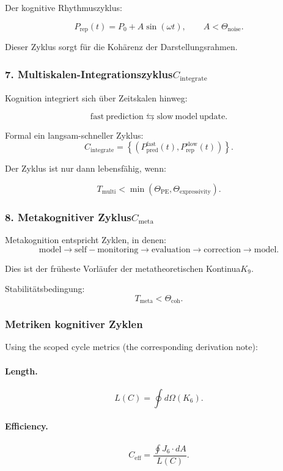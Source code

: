 Der kognitive Rhythmuszyklus:

\[
 P_{\mathrm{rep}}(t) = P_0 + A\sin(\omega t),\qquad
 A < \Theta_{\mathrm{noise}}.
\]

Dieser Zyklus sorgt für die Kohärenz der Darstellungsrahmen.

\subsubsection{7. Multiskalen-Integrationszyklus$C_{\mathrm{integrate}}$}

Kognition integriert sich über Zeitskalen hinweg:

\[
 \mathrm{fast\ prediction}
 \leftrightarrows
 \mathrm{slow\ model\ update}.
\]

Formal ein langsam-schneller Zyklus:
\[
 C_{\mathrm{integrate}} =
 \left\{
   (P_{\mathrm{pred}}^{\mathrm{fast}}(t),
    P_{\mathrm{rep}}^{\mathrm{slow}}(t))
 \right\}.
\]

Der Zyklus ist nur dann lebensfähig, wenn:

\[
 T_{\mathrm{multi}} < \min(\Theta_{\mathrm{PE}},\Theta_{\mathrm{expressivity}}).
\]

\subsubsection{8. Metakognitiver Zyklus$C_{\mathrm{meta}}$}

Metakognition entspricht Zyklen, in denen:
\[
 \mathrm{model}
 \to 
 \mathrm{self-monitoring}
 \to
 \mathrm{evaluation}
 \to
 \mathrm{correction}
 \to
 \mathrm{model}.
\]

Dies ist der früheste Vorläufer der metatheoretischen Kontinua$K_9$.

Stabilitätsbedingung:
\[
 T_{\mathrm{meta}} < \Theta_{\mathrm{coh}}.
\]

\subsubsection{Metriken kognitiver Zyklen}

Using the scoped cycle metrics (the corresponding derivation note):

\paragraph{Length.}
\[
  L(C)=\oint d\Omega(K_6).
\]

\paragraph{Efficiency.}
\[
  C_{\mathrm{eff}}
    = \frac{\oint J_6\cdot dA}{L(C)}.
\]

